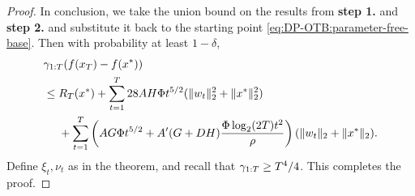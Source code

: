 \begin{proof}
In conclusion, we take the union bound on the results from \textbf{step 1.} and \textbf{step 2.} and substitute it back to the starting point \eqref{eq:DP-OTB:parameter-free-base}.  Then with probability at least $1-\delta$,
\begin{align*}
    &\gamma_{1:T}(f(x_T)-f(x^*)) \\
    &\leq R_T(x^*) + \sum_{t=1}^T 28AH\Phi t^{5/2}(\|w_t\|_2^2+\|x^*\|_2^2)  \\
    & \quad \ + \sum_{t=1}^T \left(AG\Phi t^{5/2} + A'(G+DH)\frac{\Phi\log_2(2T)t^2}{\rho}\right)(\|w_t\|_2+\|x^*\|_2).
\end{align*}
Define $\xi_t,\nu_t$ as in the theorem, and recall that $\gamma_{1:T}\geq T^4/4$. This completes the proof.
\end{proof}



